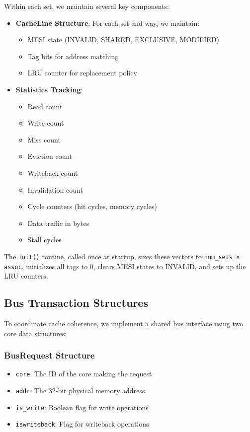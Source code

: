 \documentclass{article}
\begin{document}
Within each set, we maintain several key components:
\begin{itemize}
    \item \textbf{CacheLine Structure}: For each set and way, we maintain:
    \begin{itemize}
        \item MESI state (INVALID, SHARED, EXCLUSIVE, MODIFIED)
        \item Tag bits for address matching
        \item LRU counter for replacement policy
    \end{itemize}
    
    \item \textbf{Statistics Tracking}:
    \begin{itemize}
        \item Read count
        \item Write count
        \item Miss count
        \item Eviction count
        \item Writeback count
        \item Invalidation count
        \item Cycle counters (hit cycles, memory cycles)
        \item Data traffic in bytes
        \item Stall cycles
    \end{itemize}
\end{itemize}

The \texttt{init()} routine, called once at startup, sizes these vectors to \texttt{num\_sets × assoc}, initializes all tags to 0, clears MESI states to INVALID, and sets up the LRU counters.

\subsection{Bus Transaction Structures}
To coordinate cache coherence, we implement a shared bus interface using two core data structures:

\subsubsection{BusRequest Structure}
\begin{itemize}
    \item \texttt{core}: The ID of the core making the request
    \item \texttt{addr}: The 32-bit physical memory address
    \item \texttt{is\_write}: Boolean flag for write operations
    \item \texttt{iswriteback}: Flag for writeback operations
\end{itemize}
\end{document}
